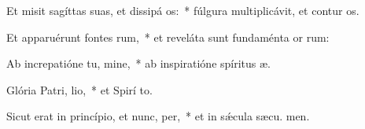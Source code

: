 \item Et misit sagíttas suas, et dissipá os:~* fúlgura multiplicávit, et contur os.
\item Et apparuérunt fontes rum,~* et reveláta sunt fundaménta or rum:
\item Ab increpatióne tu, mine,~* ab inspiratióne spíritus  æ.
\item Glória Patri,  lio,~* et Spirí to.
\item Sicut erat in princípio, et nunc,  per,~* et in sǽcula sæcu. men.
